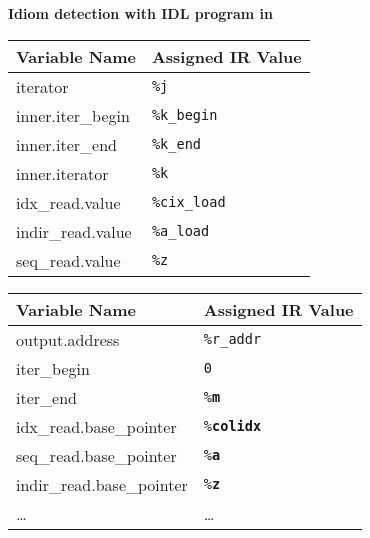 \centering
\vspace{0.0em}
{\centering
\begin{minipage}{0.05\linewidth}
\vspace{0pt}
\centering
{}
\end{minipage}
\begin{minipage}{\linewidth}
\centering
\textbf{Idiom detection with IDL program in }
\end{minipage}
\begin{minipage}{0.05\linewidth}
\vspace{0pt}
\centering
{}
\end{minipage}
}

{\centering
\footnotesize 
\begin{tabular}{l|l}
\textbf{Variable Name} & \textbf{Assigned IR Value}\\
\hline
iterator                    & \texttt{\%j}\\
inner.iter\_begin           & \texttt{\%k\_begin}\\
inner.iter\_end             & \texttt{\%k\_end}\\
inner.iterator              & \texttt{\%k}\\
idx\_read.value             & \texttt{\%cix\_load}\\
indir\_read.value           & \texttt{\%a\_load}\\
seq\_read.value             & \texttt{\%z}\\
\end{tabular}
\hspace{0.5cm}
\begin{tabular}{l|l}
\textbf{Variable Name} & \textbf{Assigned IR Value}\\
\hline
output.address              & \texttt{\%r\_addr}\\
iter\_begin                 & \texttt{0}\\
iter\_end                   & \texttt{\%\bf m}\\
idx\_read.base\_pointer     & \texttt{\%\bf colidx}\\
seq\_read.base\_pointer     & \texttt{\%\bf a}\\
indir\_read.base\_pointer   & \texttt{\%\bf z}\\
\dots                       & \dots\vspace{-0.5mm}\\
\end{tabular}

}

